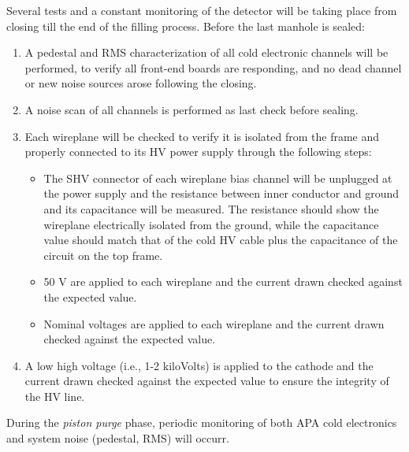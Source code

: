 Several tests and a constant monitoring of the detector will be taking place from  closing till the end of the filling process.
Before the last manhole is sealed:
\begin{enumerate}

    \item A pedestal and RMS characterization of all cold electronic channels will be performed, to verify all  front-end boards are responding, and no dead channel or new noise sources arose following the  closing.
    
    \item A noise scan of all  channels is performed as last check before sealing.

    \item Each  wireplane will be checked to verify it is isolated from the  frame and properly connected to its HV power supply through the following steps:
    
\begin{itemize}

    \item The SHV connector of each wireplane bias channel will be unplugged at the power supply and the resistance between inner conductor and ground and its capacitance will be measured. The resistance should show the wireplane electrically isolated from the ground, while the capacitance value should match that of the cold HV cable plus the capacitance of the circuit on the  top frame.

    \item 50 V are applied to each wireplane and the current drawn checked against the expected value.
    
    \item Nominal voltages are applied to each wireplane and the current drawn checked against the expected value. 
    
\end{itemize}

    \item A low high voltage (i.e., 1-2 kiloVolts) is applied to the cathode and the current drawn checked against the expected value to ensure the integrity of the HV line.

\end{enumerate}

During the \textit{piston purge} phase, periodic monitoring of both APA cold electronics and  system noise (pedestal, RMS) will occurr.

